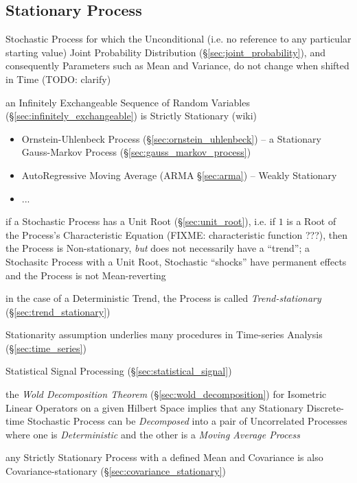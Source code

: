 \subsection{Stationary Process}\label{sec:stationary_process}

Stochastic Process for which the Unconditional (i.e. no reference to any
particular starting value) Joint Probability Distribution
(\S\ref{sec:joint_probability}), and consequently Parameters such as Mean and
Variance, do not change when shifted in Time (TODO: clarify)

\fist an Infinitely Exchangeable Sequence of Random Variables
(\S\ref{sec:infinitely_exchangeable}) is Strictly Stationary (wiki)

\begin{itemize}
  \item Ornstein-Uhlenbeck Process (\S\ref{sec:ornstein_uhlenbeck}) -- a
    Stationary Gauss-Markov Process (\S\ref{sec:gauss_markov_process})
  \item AutoRegressive Moving Average (ARMA \S\ref{sec:arma}) -- Weakly
    Stationary
  \item ...
\end{itemize}

if a Stochastic Process has a Unit Root (\S\ref{sec:unit_root}), i.e. if $1$ is
a Root of the Process's Characteristic Equation (FIXME: characteristic function
???), then the Process is Non-stationary, \emph{but} does not necessarily have a
``trend''; a Stochasitc Process with a Unit Root, Stochastic ``shocks'' have
permanent effects and the Process is not Mean-reverting

in the case of a Deterministic Trend, the Process is called
\emph{Trend-stationary} (\S\ref{sec:trend_stationary})

\fist Stationarity assumption underlies many procedures in Time-series Analysis
(\S\ref{sec:time_series})

\fist Statistical Signal Processing (\S\ref{sec:statistical_signal})

the \emph{Wold Decomposition Theorem} (\S\ref{sec:wold_decomposition}) for
Isometric Linear Operators on a given Hilbert Space implies that any Stationary
Discrete-time Stochastic Process can be \emph{Decomposed} into a pair of
Uncorrelated Processes where one is \emph{Deterministic} and the other is a
\emph{Moving Average Process}

any Strictly Stationary Process with a defined Mean and Covariance is also
Covariance-stationary (\S\ref{sec:covariance_stationary})

